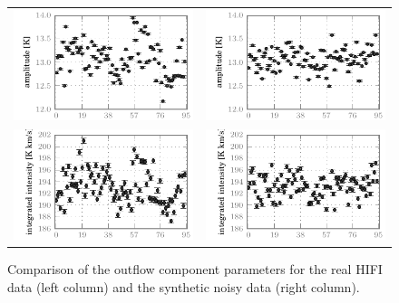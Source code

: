 \begin{figure}[p]
\begin{tabular}{@{}c@{}c@{}}
            \includegraphics{spread_98_outf_ampl_corrected}&
            \includegraphics{spread_98_outf_ampl_noisy}    \\
            \includegraphics{spread_98_outf_iint_corrected}&
            \includegraphics{spread_98_outf_iint_noisy}    \\
            \bottomrule
        \end{tabular}
        \caption{
            Comparison of the  outflow component parameters
            for the real HIFI data (left column)
            and the synthetic noisy data (right column).
        }
        \label{fig:fit_outf_98}
    \end{figure}

